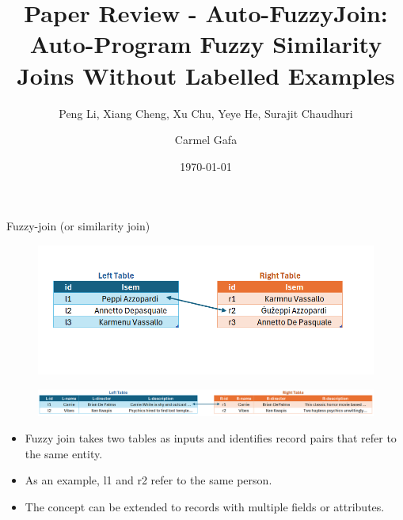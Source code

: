 \documentclass[8pt]{beamer} %
\title{Paper Review - Auto-FuzzyJoin: Auto-Program Fuzzy Similarity Joins Without Labelled Examples}
\subtitle{Peng Li, Xiang Cheng, Xu Chu, Yeye He, Surajit Chaudhuri}
\date{\today}
\author{Carmel Gafa}
\begin{document}


\begin{frame}[plain]
    \maketitle
\end{frame}

\small
\begin{frame}{Fuzzy-join (or similarity join)}
	\begin{figure}
		\centering
		\includegraphics[width=0.7\linewidth]{img/img-fuzzyjoin-1}
	\end{figure}

	\begin{figure}
		\centering
		\includegraphics[width=1\linewidth]{img/img-fuzzyjoin-2}
	\end{figure}

	\begin{itemize}
		\item Fuzzy join takes two tables as inputs and identifies record pairs that refer to the same entity.
		\item As an example, l1 and r2 refer to the same person.
		\item The concept can be extended to records with multiple fields or attributes.
	\end{itemize}
\end{frame}
\end{document}
